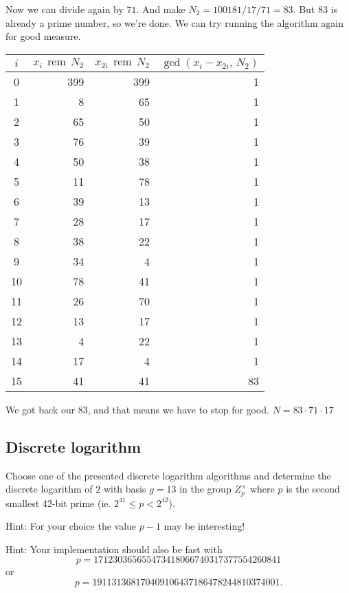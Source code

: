 \documentclass{article}
\newcommand{\rem}{\,\operatorname{rem}\,}
\begin{document}
  Now we can divide again by $71$.
  And make $N_2 = 100 181 / 17 / 71 = 83$.
  But $83$ is already a prime number, so we're done.
  We can try running the algorithm again for good measure.

  \begin{center}
    \begin{tabular}{c|rrr}
      $i$ & $x_i \rem N_2$ & $x_{2i} \rem N_2$ & $\gcd(x_i - x_{2i},\, N_2)$ \\\hline
      0 & 399 & 399 & 1 \\
      1 & 8 & 65 & 1 \\
      2 & 65 & 50 & 1 \\
      3 & 76 & 39 & 1 \\
      4 & 50 & 38 & 1 \\
      5 & 11 & 78 & 1 \\
      6 & 39 & 13 & 1 \\
      7 & 28 & 17 & 1 \\
      8 & 38 & 22 & 1 \\
      9 & 34 & 4 & 1 \\
      10 & 78 & 41 & 1 \\
      11 & 26 & 70 & 1 \\
      12 & 13 & 17 & 1 \\
      13 & 4 & 22 & 1 \\
      14 & 17 & 4 & 1 \\
      15 & 41 & 41 & 83 \\
    \end{tabular}
  \end{center}

  We got back our $83$, and that means we have to stop for good.
  $N = 83 \cdot 71 \cdot 17$

  \subsection{Discrete logarithm}
  \begin{centerframebox}
    Choose one of the presented discrete logarithm algorithms and determine
    the discrete logarithm of $2$ with basis $g = 13$ in the group $Z^\times_p$ where $p$ is the
    second smallest 42-bit prime (ie. $2^{41} \leq p < 2^{42}$).

    Hint: For your choice the value $p - 1$ may be interesting!

    Hint: Your implementation should also be fast with
    \[p = 171 230 365 655 473 418 066 740 317 377 554 260 841\]
    or
    \[p = 191 131 368 170 409 106 437 186 478 244 810 374 001.\]
  \end{centerframebox}
\end{document}

